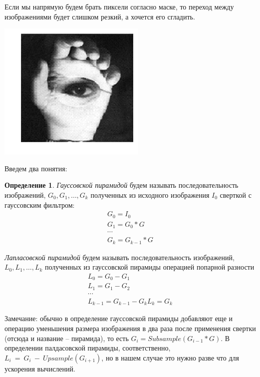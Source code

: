 \documentclass[]{book}
\theoremstyle{definition}
\newtheorem*{defn*}{Определение}
\begin{document}
Если мы напрямую будем брать пиксели согласно маске, то переход между изображениями будет слишком резкий, а хочется его сгладить. 

\begin{center}
    \includegraphics[scale=0.4]{images/naive.png}
\end{center}

Введем два понятия:

\begin{defn*} \textit{Гауссовской пирамидой} будем называть последовательность изображений, $G_0, G_1, \ldots, G_k$ полученных из исходного изображения $I_0$ сверткой с гауссовским фильтром:
\begin{gather*}
    G_0 = I_0 \\
    G_1 = G_0 \ast G \\
    \cdots \\
    G_k = G_{k - 1} \ast G
\end{gather*}

\textit{Лапласовской пирамидой} будем называть последовательность изображений, $L_0, L_1, \ldots, L_k$ полученных из гауссовской пирамиды операцией попарной разности
\begin{gather*}
    L_0 = G_0 - G_1 \\
    L_1 = G_1 - G_2 \\
    \cdots \\
    L_{k - 1} = G_{k - 1} - G_k
    L_k = G_k
\end{gather*}
\end{defn*}

Замечание: обычно в определение гауссовской пирамиды добавляют еще и операцию уменьшения размера изображения в два раза после применения свертки (отсюда и название -- пирамида), то есть $G_i = Subsample(G_{i - 1} \ast G)$. В определении палдасовской пирамиды, соответственно, 
$L_i~=~G_i~-~Upsample(G_{i + 1})$, но в нашем случае это нужно разве что для ускорения вычислений.
\end{document}
